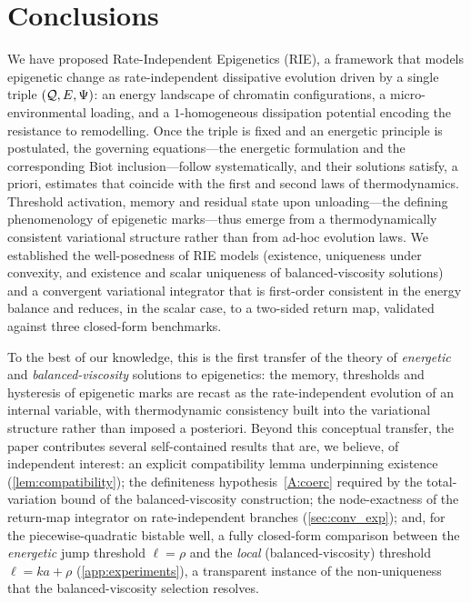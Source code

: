 \section{Conclusions}\label{sec:conclusions}

We have proposed Rate-Independent Epigenetics (RIE), a framework that
models epigenetic change as rate-independent dissipative evolution
driven by a single triple $(\mathcal{Q},E,\Psi)$: an energy landscape of
chromatin configurations, a micro-environmental loading, and a
$1$-homogeneous dissipation potential encoding the resistance to
remodelling. Once the triple is fixed and an energetic principle is
postulated, the governing equations---the energetic formulation and the
corresponding Biot inclusion---follow systematically, and their solutions
satisfy, a priori, estimates that coincide with the first and second
laws of thermodynamics. Threshold activation, memory and residual state
upon unloading---the defining phenomenology of epigenetic marks---thus
emerge from a thermodynamically consistent variational structure rather
than from ad-hoc evolution laws. We established the well-posedness of
RIE models (existence, uniqueness under convexity, and existence and
scalar uniqueness of balanced-viscosity solutions) and a convergent
variational integrator that is first-order consistent in the energy
balance and reduces, in the scalar case, to a two-sided return map,
validated against three closed-form benchmarks.

To the best of our knowledge, this is the first transfer of the theory
of \emph{energetic} and \emph{balanced-viscosity} solutions to
epigenetics: the memory, thresholds and hysteresis of epigenetic marks
are recast as the rate-independent evolution of an internal variable,
with thermodynamic consistency built into the variational structure
rather than imposed a posteriori. Beyond this conceptual transfer, the
paper contributes several self-contained results that are, we believe,
of independent interest: an explicit compatibility lemma underpinning
existence (\cref{lem:compatibility}); the definiteness
hypothesis~\ref{A:coerc} required by the total-variation bound of the
balanced-viscosity construction; the node-exactness of the
return-map integrator on rate-independent branches
(\cref{sec:conv_exp}); and, for the piecewise-quadratic bistable well, a
fully closed-form comparison between the \emph{energetic} jump threshold
$\ell=\rho$ and the \emph{local} (balanced-viscosity) threshold
$\ell=ka+\rho$ (\cref{app:experiments}), a transparent instance of the
non-uniqueness that the balanced-viscosity selection resolves.

